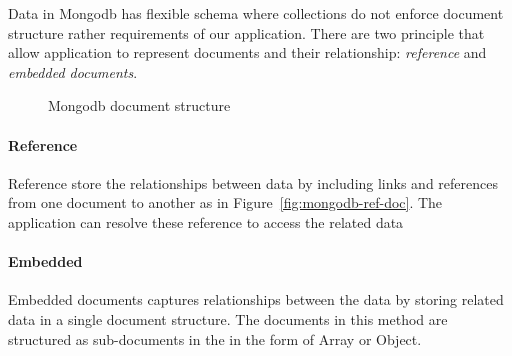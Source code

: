 Data in Mongodb has flexible schema where collections do not enforce document structure rather requirements of our application. There are two principle that allow application to represent documents and their relationship: \textit{reference} and \textit{embedded documents}. 

\begin{figure}
	\centering
	\centering
	\caption{Mongodb document structure}
	\label{fig:mongodb-doc}
	 
\end{figure}

\paragraph{Reference}
		Reference store the relationships between data by including links and references from one document to another as in  Figure~\ref{fig:mongodb-ref-doc}. The application can resolve these reference to access the related data
\paragraph{Embedded}
	Embedded documents captures relationships between the data by storing related data in a single document structure. The documents in this method are structured as sub-documents in the in the form of Array or Object. 
